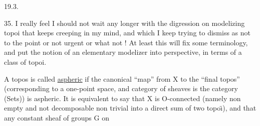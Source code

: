 19.3.

35.  I really feel I should not wait any longer with the digression on
modelizing topoi that keeps creeping in my mind,  and which I keep trying
to dismiss as not to the point or not urgent or what not !  At least this
will fix some terminology,  and put the notion of an elementary modelizer
into perspective,  in terms of a  class of topoi.

A topos is called \uline{aspheric} if the canonical ``map'' from X to the ``final
topos'' (corresponding to a one-point space,  and  category of sheaves
is the category (Sets)) is aspheric.  It is equivalent to say that X is
O-connected (namely non empty\inserted{,} and not decomposable non trivial into a
direct sum of two topo\"{\i}),  and that  any constant sheaf of groups G on
